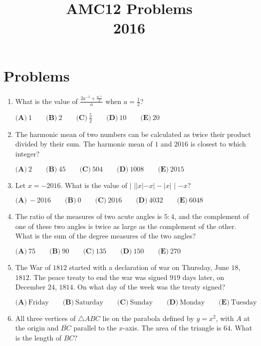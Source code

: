 \documentclass{article}
\title{AMC12 Problems \\ 2016}
\date{}
\begin{document}
\maketitle\thispagestyle{fancy}\newpage\section*{Problems}\begin{enumerate}[label=\arabic*., itemsep=0.5em]\item What is the value of $\frac{2a^{-1}+\frac{a^{-1}}{2}}{a}$ when $a= \frac{1}{2}$?

$\textbf{(A)}\ 1\qquad\textbf{(B)}\ 2\qquad\textbf{(C)}\ \frac{5}{2}\qquad\textbf{(D)}\ 10\qquad\textbf{(E)}\ 20$\par \vspace{0.5em}\item The harmonic mean of two numbers can be calculated as twice their product divided by their sum. The harmonic mean of $1$ and $2016$ is closest to which integer?

$\textbf{(A)}\ 2 \qquad
\textbf{(B)}\ 45 \qquad
\textbf{(C)}\ 504 \qquad
\textbf{(D)}\ 1008 \qquad
\textbf{(E)}\ 2015 $\par \vspace{0.5em}\item Let $x=-2016$. What is the value of $\bigg|$ $||x|-x|-|x|$ $\bigg|$ $-x$?

$\textbf{(A)}\ -2016\qquad\textbf{(B)}\ 0\qquad\textbf{(C)}\ 2016\qquad\textbf{(D)}\ 4032\qquad\textbf{(E)}\ 6048$\par \vspace{0.5em}\item The ratio of the measures of two acute angles is $5:4$, and the complement of one of these two angles is twice as large as the complement of the other. What is the sum of the degree measures of the two angles?

$\textbf{(A)}\ 75\qquad\textbf{(B)}\ 90\qquad\textbf{(C)}\ 135\qquad\textbf{(D)}\ 150\qquad\textbf{(E)}\ 270$\par \vspace{0.5em}\item The War of $1812$ started with a declaration of war on Thursday, June $18$, $1812$. The peace treaty to end the war was signed $919$ days later, on December $24$, $1814$. On what day of the week was the treaty signed? 

$\textbf{(A)}\ \text{Friday} \qquad
\textbf{(B)}\ \text{Saturday} \qquad
\textbf{(C)}\ \text{Sunday} \qquad
\textbf{(D)}\ \text{Monday} \qquad
\textbf{(E)}\ \text{Tuesday} $\par \vspace{0.5em}\item All three vertices of $\bigtriangleup ABC$ lie on the parabola defined by $y=x^2$, with $A$ at the origin and $\overline{BC}$ parallel to the $x$-axis. The area of the triangle is $64$. What is the length of $BC$?  


\end{enumerate}
\end{document}
